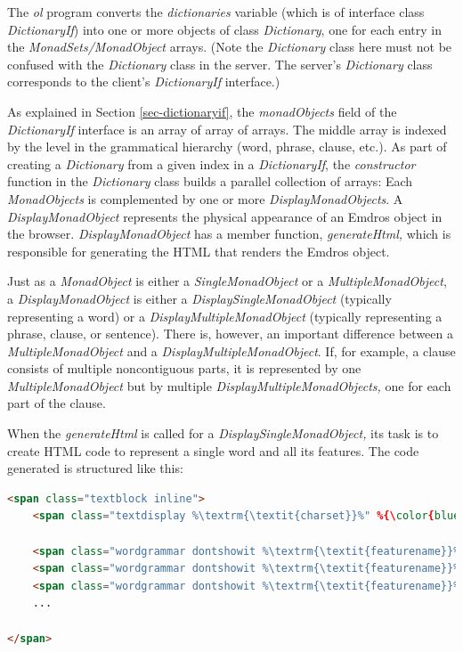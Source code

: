 \documentclass[11pt,oneside,a4paper]{memoir}
\begin{document}
The \emph{ol} program converts the \emph{dictionaries} variable (which is of interface class
\emph{DictionaryIf}) into one or more objects of class \emph{Dictionary}, one for each entry in the
\emph{MonadSets/MonadObject} arrays. (Note the \emph{Dictionary} class here must not be confused
with the \emph{Dictionary} class in the server. The server's \emph{Dictionary} class corresponds to
the client's \emph{DictionaryIf} interface.)

As explained in Section \ref{sec-dictionaryif}, the \emph{monadObjects} field of the
\emph{DictionaryIf} interface is an array of array of arrays. The middle array is indexed by the
level in the grammatical hierarchy (word, phrase, clause, etc.). As part of creating a
\emph{Dictionary} from a given index in a \emph{DictionaryIf}, the \emph{constructor} function in
the \emph{Dictionary} class builds a parallel collection of arrays: Each \emph{MonadObjects} is
complemented by one or more \emph{DisplayMonadObjects}. A \emph{DisplayMonadObject} represents the
physical appearance of an Emdros object in the browser. \emph{DisplayMonadObject} has a member
function, \emph{generateHtml,} which is responsible for generating the HTML that renders the Emdros
object.

Just as a \emph{MonadObject} is either a \emph{SingleMonadObject} or a \emph{MultipleMonadObject}, a
\emph{DisplayMonadObject} is either a \emph{DisplaySingleMonadObject} (typically representing a
word) or a \emph{DisplayMultipleMonadObject} (typically representing a phrase, clause, or sentence).
There is, however, an important difference between a \emph{MultipleMonadObject} and a
\emph{DisplayMultipleMonadObject}. If, for example, a clause consists of multiple noncontiguous
parts, it is represented by one \emph{MultipleMonadObject} but by multiple
\emph{DisplayMultipleMonadObjects,} one for each part of the clause.

When the \emph{generateHtml} is called for a \emph{DisplaySingleMonadObject,} its task is to create
HTML code to represent a single word and all its features. The code generated is structured like
this:

\begin{lstlisting}[language=HTML]
<span class="textblock inline">
    <span class="textdisplay %\textrm{\textit{charset}}%" %{\color{blue} data-idd}%="%\textrm{\textit{ID\_D}}%">%\textrm{\textit{text}}%</span>

    <span class="wordgrammar dontshowit %\textrm{\textit{featurename}}% %\textrm{\textit{charset}}%">%\textrm{\textit{featurevalue}}%</span>
    <span class="wordgrammar dontshowit %\textrm{\textit{featurename}}% %\textrm{\textit{charset}}%">%\textrm{\textit{featurevalue}}%</span>
    <span class="wordgrammar dontshowit %\textrm{\textit{featurename}}% %\textrm{\textit{charset}}%">%\textrm{\textit{featurevalue}}%</span>
    ...
  
</span>
\end{lstlisting}
\end{document}
